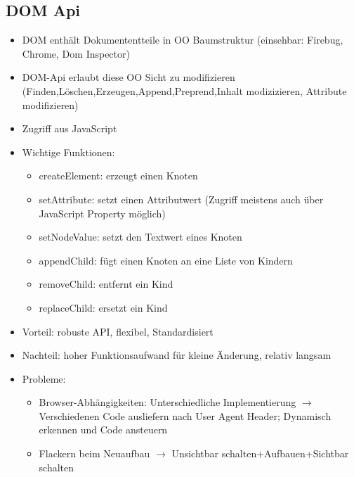 \documentclass{article} %
\begin{document}
	\subsection{DOM Api}
	\begin{itemize}
		\item DOM enthält Dokumententteile in OO Baumstruktur (einsehbar: Firebug, Chrome, Dom Inspector)
		\item DOM-Api erlaubt diese OO Sicht zu modifizieren (Finden,Löschen,Erzeugen,Append,Preprend,Inhalt modizizieren, Attribute modifizieren)
		\item Zugriff aus JavaScript
		\item Wichtige Funktionen:
		\begin{itemize}
			\item createElement: erzeugt einen Knoten
			\item setAttribute: setzt einen Attributwert (Zugriff meistens auch über JavaScript Property möglich)
			\item setNodeValue: setzt den Textwert eines Knoten
			\item appendChild: fügt einen Knoten an eine Liste von Kindern
			\item removeChild: entfernt ein Kind
			\item replaceChild: ersetzt ein Kind
		\end{itemize}
		\item Vorteil: robuste API, flexibel, Standardisiert
		\item Nachteil: hoher Funktionsaufwand für kleine Änderung, relativ langsam 
		\item Probleme:
		\begin{itemize}
			\item Browser-Abhängigkeiten: Unterschiedliche Implementierung $\rightarrow$ Verschiedenen Code ausliefern nach User Agent Header; Dynamisch erkennen und Code ansteuern
			\item Flackern beim Neuaufbau $\rightarrow$ Unsichtbar schalten+Aufbauen+Sichtbar schalten
		\end{itemize}
	\end{itemize}
\end{document}
